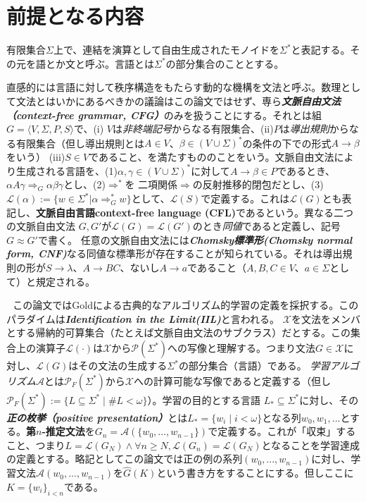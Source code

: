 \documentclass{jsbook}
\begin{document}
\chapter{前提となる内容}

有限集合$\Sigma$上で、連結を演算として自由生成されたモノイドを$\Sigma^*$と表記する。その元を語とか文と呼ぶ。言語とは$\Sigma^*$の部分集合のこととする。

直感的には言語に対して秩序構造をもたらす動的な機構を文法と呼ぶ。数理として文法とはいかにあるべきかの議論はこの論文ではせず、専ら{\bf \emph{文脈自由文法（context-free grammar, CFG）}}のみを扱うことにする。それとは組$G=\langle V,\Sigma,P,S\rangle$で、(i) $V$は\emph{非終端記号}からなる有限集合、(ii)$P$は\emph{導出規則}からなる有限集合（但し導出規則とは$A\in V$、$\beta\in(V\cup\Sigma)^*$の条件の下での形式$A\to\beta$をいう） (iii)$S\in V$であること、を満たすもののことをいう。文脈自由文法により生成される言語を、(1)$\alpha,\gamma\in(V\cup\Sigma)^*$に対して$A\to\beta\in P$であるとき、$\alpha A\gamma\Rightarrow_G\alpha\beta\gamma$とし、(2)$\Rightarrow^*$を 二項関係$\Rightarrow$の反射推移的閉包だとし、(3)$\mathcal{L}(\alpha):=\{w\in\Sigma^* | \alpha\Rightarrow^*_Gw\}$として、$\mathcal{L}(S)$で定義する。これは$\mathcal{L}(G)$とも表記し、{\bf 文脈自由言語context-free language (CFL)}であるという。異なる二つの文脈自由文法 $G,G'$が$\mathcal{L}(G)=\mathcal{L}(G')$のとき\emph{同値}であると定義し、記号$G\approx G'$で書く。
任意の文脈自由文法には{\bf \emph{Chomsky標準形(Chomsky normal form, CNF)}}なる同値な標準形が存在することが知られている。それは導出規則の形が$S\to\lambda$、$A\to BC$、ないし$A\to a$であること（$A,B,C\in V$、$a\in\Sigma$として）と規定される。

\,\,\,\,この論文ではGold\cite{Gold:1967}による古典的なアルゴリズム的学習の定義を採択する。このパラダイムは{\bf \emph{Identification in the Limit(IIL)}}と言われる。 $\mathcal{X}$を文法をメンバとする帰納的可算集合（たとえば文脈自由文法のサブクラス）だとする。この集合上の演算子$\mathcal{L}(\cdot)$は$\mathcal{X}$から$\mathcal{P}(\Sigma^*)$への写像と理解する。つまり文法$G\in\mathcal{X}$に対し、$\mathcal{L}(G)$はその文法の生成する$\Sigma^*$の部分集合（言語）である。 \emph{学習アルゴリズム}$\mathcal{A}$とは$\mathcal{P}_F(\Sigma^*)$から$\mathcal{X}$への計算可能な写像であると定義する（但し$\mathcal{P}_F(\Sigma^*):=\{L\subseteq\Sigma^*\mid \# L<\omega\}$）。学習の目的とする言語 $L_*\subseteq\Sigma^*$に対し、その{\bf \emph{正の枚挙（positive presentation）}}とは$L_*=\{w_i\mid i<\omega\}$となる列$w_0,w_1,...$とする。{\bf 第$n$-推定文法}を$G_n=\mathcal{A}(\{w_0,...,w_{n-1}\})$で定義する。これが「収束」すること、つまり$L=\mathcal{L}(G_N)\land\forall n\geq N, \mathcal{L}(G_n)=\mathcal{L}(G_N)$となることを学習達成の定義とする。略記としてこの論文では正の例の系列$(w_0,...,w_{n-1})$に対し、学習文法$\mathcal{A}(w_0,...,w_{n-1})$を$\hat{G}(K)$という書き方をすることにする。但しここに$K=\{w_i\}_{i<n}$である。
\end{document}
